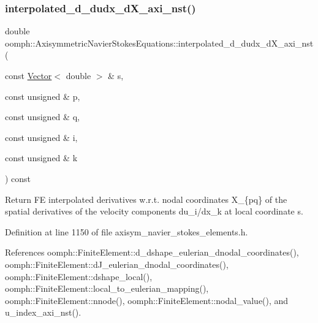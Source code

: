\subsubsection{\texorpdfstring{interpolated\+\_\+d\+\_\+dudx\+\_\+d\+X\+\_\+axi\+\_\+nst()}{interpolated\_d\_dudx\_dX\_axi\_nst()}}
{\footnotesize\ttfamily double oomph\+::\+Axisymmetric\+Navier\+Stokes\+Equations\+::interpolated\+\_\+d\+\_\+dudx\+\_\+d\+X\+\_\+axi\+\_\+nst (\begin{DoxyParamCaption}\item[{const \hyperlink{classoomph_1_1Vector}{Vector}$<$ double $>$ \&}]{s,  }\item[{const unsigned \&}]{p,  }\item[{const unsigned \&}]{q,  }\item[{const unsigned \&}]{i,  }\item[{const unsigned \&}]{k }\end{DoxyParamCaption}) const\hspace{0.3cm}{\ttfamily [inline]}}



Return FE interpolated derivatives w.\+r.\+t. nodal coordinates X\+\_\+\{pq\} of the spatial derivatives of the velocity components du\+\_\+i/dx\+\_\+k at local coordinate s. 



Definition at line 1150 of file axisym\+\_\+navier\+\_\+stokes\+\_\+elements.\+h.



References oomph\+::\+Finite\+Element\+::d\+\_\+dshape\+\_\+eulerian\+\_\+dnodal\+\_\+coordinates(), oomph\+::\+Finite\+Element\+::d\+J\+\_\+eulerian\+\_\+dnodal\+\_\+coordinates(), oomph\+::\+Finite\+Element\+::dshape\+\_\+local(), oomph\+::\+Finite\+Element\+::local\+\_\+to\+\_\+eulerian\+\_\+mapping(), oomph\+::\+Finite\+Element\+::nnode(), oomph\+::\+Finite\+Element\+::nodal\+\_\+value(), and u\+\_\+index\+\_\+axi\+\_\+nst().

\mbox{\label{classoomph_1_1AxisymmetricNavierStokesEquations_a1cc63eac8d17b2973b5fde4a3dc8f767}} 

